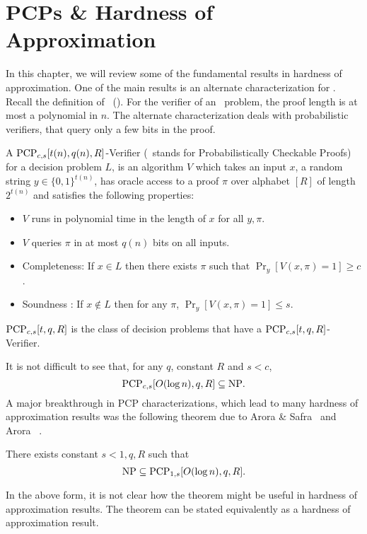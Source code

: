 
\chapter{PCPs \& Hardness of Approximation}

In this chapter, we will review some of the fundamental results in hardness of
approximation. One of the main results is an alternate characterization for \NP.
Recall the definition of \NP\ ().
For the verifier of an \NP\ problem, the proof length is at most a polynomial in
$n$. The alternate characterization deals with probabilistic verifiers, that
query only a few bits in the proof.

\begin{definition}[{$\PCP_{c,s}[t,q,R]$}] 
A $\textsf{\textnormal{PCP}}_{c,s}[t(n),q(n), R]$-Verifier (\PCP\ stands for Probabilistically 
Checkable Proofs)
for a decision problem $L$, is an algorithm $V$
which takes an input $x$, a random string
$y \in \{0,1\}^{t(n)}$, has oracle access to a proof $\pi$ over alphabet $[R]$ of length $2^{t(n)}$
 and satisfies the following properties:
 \begin{itemize}
 \item $V$ runs in polynomial time in the length of $x$ for all $y,\pi$.
\item $V$ queries $\pi$ in at most $q(n)$ bits on all inputs. 
\item Completeness: If $x \in L$ then there exists $\pi$ such that $\Pr_y[V(x,\pi)=1]\geq c$.
\item Soundness : If $x \notin L$ then for any $\pi$, $\Pr_y[V(x, \pi)=1] \leq
s$.
 \end{itemize} 
 $\PCP_{c,s}[t,q,R]$ is the class of decision problems that have
a $ \PCP_{c,s}[t,q,R]$-Verifier.
 \end{definition} 
 It is not difficult to see that,
for any $q$, constant $R$ and $s<c$, $$\textsf{\textnormal{PCP}}_{c,s}[O(\log n),q,R] \subseteq
\textsf{\textnormal{NP}}.$$ A major breakthrough in PCP characterizations, which lead to many
hardness of approximation results was the following theorem due to Arora \&
Safra~\cite{AroraS1998} and Arora \etal~\cite{AroraLMSS1998}. 
\begin{theorem} 
There exists constant $s <1, q,R$ such that $$\textsf{\textnormal{NP}} \subseteq
\textsf{\textnormal{PCP}}_{1,s}[O(\log n),q,R].$$ 
\end{theorem} 
In the above form, it is not clear
how the theorem might be useful in hardness of approximation results. The
theorem can be stated equivalently as a hardness of approximation result.

